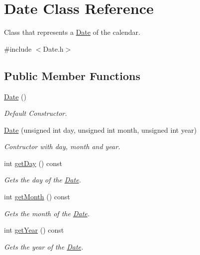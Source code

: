 \hypertarget{class_date}{}\section{Date Class Reference}
\label{class_date}


Class that represents a \hyperlink{class_date}{Date} of the calendar.  




{\ttfamily \#include $<$Date.\+h$>$}

\subsection*{Public Member Functions}
\begin{DoxyCompactItemize}
\item 
\hyperlink{class_date_a4e59ed4ba66eec61c27460c5d09fa1bd}{Date} ()
\begin{DoxyCompactList}\small\item\em Default Constructor. \end{DoxyCompactList}\item 
\hyperlink{class_date_a28c6604a0f8ed8216becf24abc20cf5b}{Date} (unsigned int day, unsigned int month, unsigned int year)
\begin{DoxyCompactList}\small\item\em Contructor with day, month and year. \end{DoxyCompactList}\item 
int \hyperlink{class_date_a0f253815240e70f4c39cb93cc68bd3f4}{get\+Day} () const
\begin{DoxyCompactList}\small\item\em Gets the day of the \hyperlink{class_date}{Date}. \end{DoxyCompactList}\item 
int \hyperlink{class_date_a332f6e3a2f6a40d73742b6dab7be0f64}{get\+Month} () const
\begin{DoxyCompactList}\small\item\em Gets the month of the \hyperlink{class_date}{Date}. \end{DoxyCompactList}\item 
int \hyperlink{class_date_a8b0869f34c2b38d108ab83ee2e770e5d}{get\+Year} () const
\begin{DoxyCompactList}\small\item\em Gets the year of the \hyperlink{class_date}{Date}. \end{DoxyCompactList}\item 

\end{DoxyCompactItemize}
